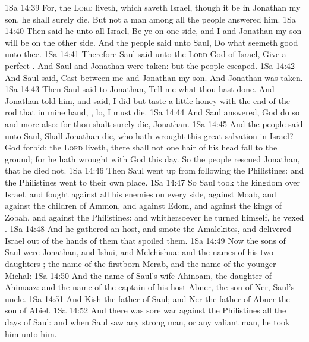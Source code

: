 \vs 1Sa 14:39 For,  the \textsc{Lord} liveth, which saveth Israel, though it be in Jonathan my son, he shall surely die. But  not a man among all the people  answered him.
\vs 1Sa 14:40 Then said he unto all Israel, Be ye on one side, and I and Jonathan my son will be on the other side. And the people said unto Saul, Do what seemeth good unto thee.
\vs 1Sa 14:41 Therefore Saul said unto the \textsc{Lord} God of Israel, Give a perfect . And Saul and Jonathan were taken: but the people escaped.
\vs 1Sa 14:42 And Saul said, Cast  between me and Jonathan my son. And Jonathan was taken.
\vs 1Sa 14:43 Then Saul said to Jonathan, Tell me what thou hast done. And Jonathan told him, and said, I did but taste a little honey with the end of the rod that  in mine hand, , lo, I must die.
\vs 1Sa 14:44 And Saul answered, God do so and more also: for thou shalt surely die, Jonathan.
\vs 1Sa 14:45 And the people said unto Saul, Shall Jonathan die, who hath wrought this great salvation in Israel? God forbid:  the \textsc{Lord} liveth, there shall not one hair of his head fall to the ground; for he hath wrought with God this day. So the people rescued Jonathan, that he died not.
\vs 1Sa 14:46 Then Saul went up from following the Philistines: and the Philistines went to their own place.
\vs 1Sa 14:47 So Saul took the kingdom over Israel, and fought against all his enemies on every side, against Moab, and against the children of Ammon, and against Edom, and against the kings of Zobah, and against the Philistines: and whithersoever he turned himself, he vexed .
\vs 1Sa 14:48 And he gathered an host, and smote the Amalekites, and delivered Israel out of the hands of them that spoiled them.
\vs 1Sa 14:49 Now the sons of Saul were Jonathan, and Ishui, and Melchishua: and the names of his two daughters ; the name of the firstborn Merab, and the name of the younger Michal:
\vs 1Sa 14:50 And the name of Saul's wife  Ahinoam, the daughter of Ahimaaz: and the name of the captain of his host  Abner, the son of Ner, Saul's uncle.
\vs 1Sa 14:51 And Kish  the father of Saul; and Ner the father of Abner  the son of Abiel.
\vs 1Sa 14:52 And there was sore war against the Philistines all the days of Saul: and when Saul saw any strong man, or any valiant man, he took him unto him.
